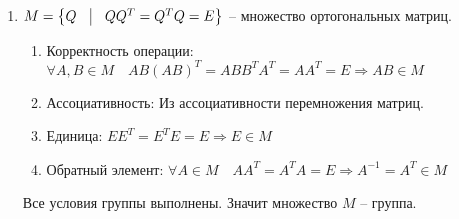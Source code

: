 \begin{solution}
\begin{enumerate}[label=\alph*)]
        \item \(M = \left\{ Q \quad \vline \quad QQ^T = Q^TQ = E \right\}\) -- множество ортогональных матриц.
        \begin{enumerate}[label=\arabic*)]
            \item Корректность операции:
            \( \forall A, B \in M \quad AB(AB)^T = ABB^TA^T = AA^T = E \Longrightarrow AB \in M
            \)
            \item Ассоциативность: Из ассоциативности перемножения матриц.
            \item Единица: \( EE^T = E^TE = E \Longrightarrow E \in M \)
            \item Обратный элемент: \( \forall A \in M \quad AA^T = A^TA = E \Longrightarrow A^{-1} = A^T \in M \)
        \end{enumerate}

        Все условия группы выполнены. Значит множество \(M\) -- группа.
    \end{enumerate}
\end{solution}